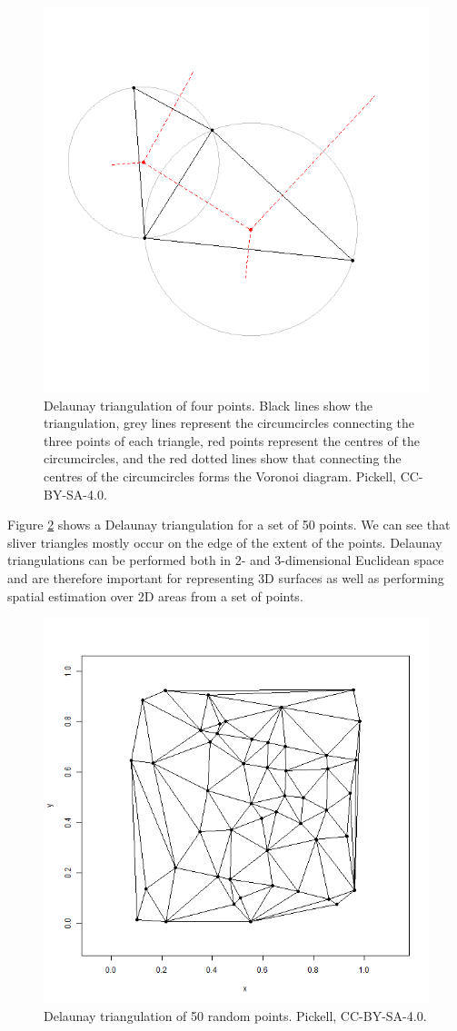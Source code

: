 \documentclass[
]{book}
\begin{document}
\begin{figure}
\includegraphics[width=0.75\linewidth]{images/07-delaunay-triangulation-circumcircles} \caption{Delaunay triangulation of four points. Black lines show the triangulation, grey lines represent the circumcircles connecting the three points of each triangle, red points represent the centres of the circumcircles, and the red dotted lines show that connecting the centres of the circumcircles forms the Voronoi diagram. Pickell, CC-BY-SA-4.0.}\label{fig:7-delaunay-triangulation-circumcircles}
\end{figure}

Figure \ref{fig:7-delaunay-triangulation} shows a Delaunay triangulation for a set of 50 points. We can see that sliver triangles mostly occur on the edge of the extent of the points. Delaunay triangulations can be performed both in 2- and 3-dimensional Euclidean space and are therefore important for representing 3D surfaces as well as performing spatial estimation over 2D areas from a set of points.

\begin{figure}
\includegraphics[width=0.75\linewidth]{images/07-delaunay-triangulation} \caption{Delaunay triangulation of 50 random points. Pickell, CC-BY-SA-4.0.}\label{fig:7-delaunay-triangulation}
\end{figure}
\end{document}
